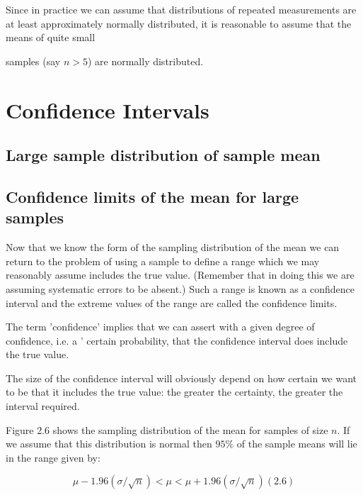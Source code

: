  

Since in practice we can assume that distributions of repeated measurements are at least approximately normally distributed, it is reasonable to assume that the means of quite small

samples (say $n>5$) are normally distributed.

 



\section{Confidence Intervals}

 

\subsection{Large sample distribution of sample mean}


 

\subsection{Confidence limits of the mean for large samples}

Now that we know the form of the sampling distribution of the mean we can return to the problem of using a sample to define a range which we may reasonably assume includes the true value. (Remember that in doing this we are assuming systematic errors to be absent.) Such a range is known as a confidence interval and the extreme values of the range are called the confidence limits.

 

The term 'confidence' implies that we can assert with a given degree of confidence, i.e. a ' certain probability, that the confidence interval does include the true value.

 

The size of the confidence interval will obviously depend on how certain we want to be that it includes the true value: the greater the certainty, the greater the interval required.

 

Figure 2.6 shows the sampling distribution of the mean for samples of size $n$. If we assume that this distribution is normal then $95\%$  of the sample means will lie in the range given by:

\[ \mu - 1.96(\sigma/\sqrt{n}) < \mu < \mu + 1.96(\sigma/\sqrt{n}) (2.6)\]

